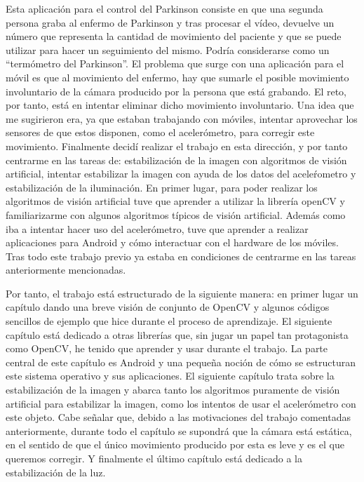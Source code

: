 \documentclass[a4paper,openright, 12pt]{book}
\begin{document}
Esta aplicación para el control del Parkinson consiste en que una segunda persona graba al enfermo de Parkinson y tras procesar el vídeo, devuelve un número que representa la cantidad de movimiento del paciente y que se puede utilizar para hacer un seguimiento del mismo. Podría considerarse como un ``termómetro del Parkinson''. El problema que surge con una aplicación para el móvil es que al movimiento del enfermo, hay que sumarle el posible movimiento involuntario de la cámara producido por la persona que está grabando. El reto, por tanto, está en intentar eliminar dicho movimiento involuntario. Una idea que me sugirieron era, ya que estaban trabajando con móviles, intentar aprovechar los sensores de que estos disponen, como el acelerómetro, para corregir este  movimiento.
\newpage
Finalmente decidí realizar el trabajo en esta dirección, y por tanto centrarme en las tareas de: estabilización de la imagen con algoritmos de visión artificial, intentar estabilizar la imagen con ayuda de los datos del aceleŕometro y estabilización de la iluminación.
En primer lugar, para poder realizar los algoritmos de visión artificial tuve que aprender a utilizar la librería openCV y familiarizarme con algunos algoritmos típicos de visión artificial. Además como iba a intentar hacer uso del acelerómetro, tuve que aprender a realizar aplicaciones para Android y cómo interactuar con el hardware de los móviles. Tras todo este trabajo previo ya estaba en condiciones de centrarme en las tareas anteriormente mencionadas.

Por tanto, el trabajo está estructurado de la siguiente manera:
en primer lugar un capítulo dando una breve visión de conjunto de OpenCV y algunos códigos sencillos de ejemplo que hice durante el proceso de aprendizaje.
\newline
El siguiente capítulo está dedicado a otras librerías que, sin jugar un papel tan protagonista como OpenCV, he tenido que aprender y usar durante el trabajo. La parte central de este capítulo es Android y una pequeña noción de cómo se estructuran este sistema operativo y sus aplicaciones.
\newline
El siguiente capítulo trata sobre la estabilización de la imagen y abarca tanto los algoritmos puramente de visión artificial para estabilizar la imagen, como los intentos de usar el acelerómetro con este objeto. Cabe señalar que, debido a las motivaciones del trabajo comentadas anteriormente, durante todo el capítulo se supondrá que la cámara está estática, en el sentido de que el único movimiento producido por esta es leve y es el que queremos corregir.
\newline
Y finalmente el último capítulo está dedicado a la estabilización de la luz.
\end{document}
